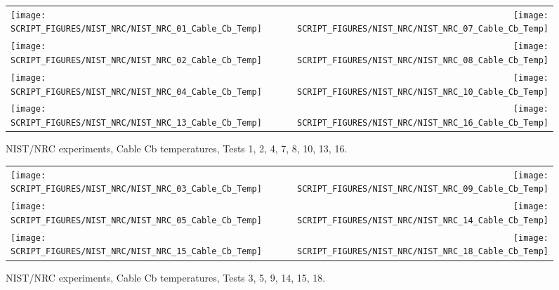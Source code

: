 \begin{figure}[p]
\begin{tabular*}{\textwidth}{l@{\extracolsep{\fill}}r}
\texttt{[image: SCRIPT\_FIGURES/NIST\_NRC/NIST\_NRC\_01\_Cable\_Cb\_Temp]} &
\texttt{[image: SCRIPT\_FIGURES/NIST\_NRC/NIST\_NRC\_07\_Cable\_Cb\_Temp]} \\
\texttt{[image: SCRIPT\_FIGURES/NIST\_NRC/NIST\_NRC\_02\_Cable\_Cb\_Temp]} &
\texttt{[image: SCRIPT\_FIGURES/NIST\_NRC/NIST\_NRC\_08\_Cable\_Cb\_Temp]} \\
\texttt{[image: SCRIPT\_FIGURES/NIST\_NRC/NIST\_NRC\_04\_Cable\_Cb\_Temp]} &
\texttt{[image: SCRIPT\_FIGURES/NIST\_NRC/NIST\_NRC\_10\_Cable\_Cb\_Temp]} \\
\texttt{[image: SCRIPT\_FIGURES/NIST\_NRC/NIST\_NRC\_13\_Cable\_Cb\_Temp]} &
\texttt{[image: SCRIPT\_FIGURES/NIST\_NRC/NIST\_NRC\_16\_Cable\_Cb\_Temp]}
\end{tabular*}
\caption{NIST/NRC experiments, Cable Cb temperatures, Tests 1, 2, 4, 7, 8, 10, 13, 16.}
\label{NIST_NRC_Cable_Cb_Closed}
\end{figure}

\begin{figure}[p]
\begin{tabular*}{\textwidth}{l@{\extracolsep{\fill}}r}
\texttt{[image: SCRIPT\_FIGURES/NIST\_NRC/NIST\_NRC\_03\_Cable\_Cb\_Temp]} &
\texttt{[image: SCRIPT\_FIGURES/NIST\_NRC/NIST\_NRC\_09\_Cable\_Cb\_Temp]} \\
\texttt{[image: SCRIPT\_FIGURES/NIST\_NRC/NIST\_NRC\_05\_Cable\_Cb\_Temp]} &
\texttt{[image: SCRIPT\_FIGURES/NIST\_NRC/NIST\_NRC\_14\_Cable\_Cb\_Temp]} \\
\texttt{[image: SCRIPT\_FIGURES/NIST\_NRC/NIST\_NRC\_15\_Cable\_Cb\_Temp]} &
\texttt{[image: SCRIPT\_FIGURES/NIST\_NRC/NIST\_NRC\_18\_Cable\_Cb\_Temp]}
\end{tabular*}
\caption{NIST/NRC experiments, Cable Cb temperatures, Tests 3, 5, 9, 14, 15, 18.}
\label{NIST_NRC_Cable_Cb_Open}
\end{figure}

